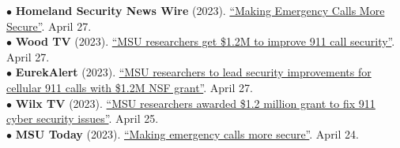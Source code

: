 \begin{flushleft}
\hspace{1 mm} $\bullet$ \hspace{1 mm}
\textbf{Homeland Security News Wire} (2023).
\href{https://www.homelandsecuritynewswire.com/dr20230427-making-emergency-calls-more-secure}{``Making Emergency Calls More Secure''}. April 27. \\


\hspace{1 mm} $\bullet$ \hspace{1 mm}
\textbf{Wood TV} (2023).
\href{https://www.woodtv.com/video/msu-researchers-get-1-2m-to-improve-911-call-security/8598883/}{``MSU researchers get \$1.2M to improve 911 call security''}. April 27. \\

\hspace{1 mm} $\bullet$ \hspace{1 mm}
\textbf{EurekAlert} (2023).
\href{https://www.eurekalert.org/news-releases/987600}{``MSU researchers to lead security improvements for cellular 911 calls with \$1.2M NSF grant''}. April 27. \\

\hspace{1 mm} $\bullet$ \hspace{1 mm}
\textbf{Wilx TV} (2023).
\href{https://www.wilx.com/2023/04/25/msu-researchers-discover-vulnerability-911-calls-made-cell-phones/}{``MSU researchers awarded \$1.2 million grant to fix 911 \\  \hspace{6 mm} cyber security issues''}.  April 25. \\

\hspace{1 mm} $\bullet$ \hspace{1 mm}
\textbf{MSU Today} (2023).
\href{https://msutoday.msu.edu/news/2023/making-emergency-calls-more-secure}{``Making emergency calls more secure''}. April 24. \\







\end{flushleft}

